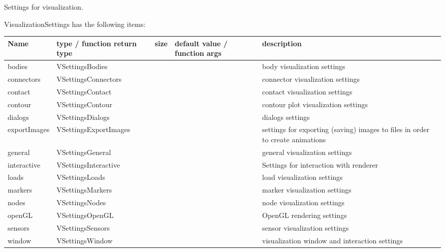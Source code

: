 
\label{sec:VisualizationSettings}
Settings for visualization. 

\noindent VisualizationSettings has the following items:
\begin{center}
  \footnotesize
  \begin{longtable}{| p{4.2cm} | p{2.5cm} | p{0.3cm} | p{3.0cm} | p{6cm} |}
    \hline
    \bf Name & \bf type / function return type & \bf size & \bf default value / function args & \bf description \\ \hline
    bodies &     VSettingsBodies &      &      &     body visualization settings\\ \hline
    connectors &     VSettingsConnectors &      &      &     connector visualization settings\\ \hline
    contact &     VSettingsContact &      &      &     contact visualization settings\\ \hline
    contour &     VSettingsContour &      &      &     contour plot visualization settings\\ \hline
    dialogs &     VSettingsDialogs &      &      &     dialogs settings\\ \hline
    exportImages &     VSettingsExportImages &      &      &     settings for exporting (saving) images to files in order to create animations\\ \hline
    general &     VSettingsGeneral &      &      &     general visualization settings\\ \hline
    interactive &     VSettingsInteractive &      &      &     Settings for interaction with renderer\\ \hline
    loads &     VSettingsLoads &      &      &     load visualization settings\\ \hline
    markers &     VSettingsMarkers &      &      &     marker visualization settings\\ \hline
    nodes &     VSettingsNodes &      &      &     node visualization settings\\ \hline
    openGL &     VSettingsOpenGL &      &      &     OpenGL rendering settings\\ \hline
    sensors &     VSettingsSensors &      &      &     sensor visualization settings\\ \hline
    window &     VSettingsWindow &      &      &     visualization window and interaction settings\\ \hline
	  \end{longtable}
	\end{center}


